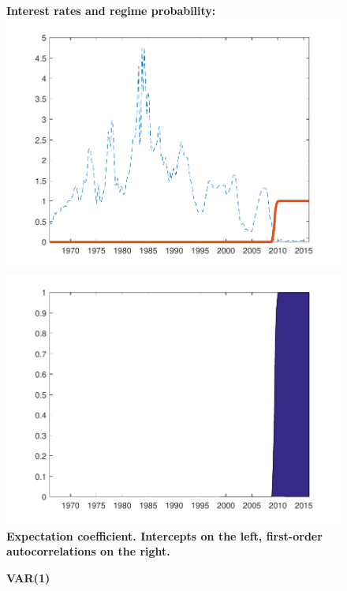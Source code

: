 \documentclass[12pt,reqno]{article}
\numberwithin{equation}{section}
\begin{document}
\begin{figure}[H]
\caption{\large{\textbf{VAR(1)}}}
\vspace{5 mm}

\textbf{Interest rates and regime probability:} \\

\includegraphics[scale=0.6]{NKPC_ree_init_VAR1_regime.pdf}
\includegraphics[scale=0.6]{NKPC_ree_init_VAR1_regimeProb.pdf}\\

\textbf{Expectation coefficient. Intercepts on the left, first-order autocorrelations on the right.}\\


\end{figure}
\end{document}
